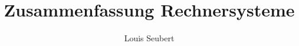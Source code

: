 \documentclass[a4paper,landscape]{article}
\title{Zusammenfassung Rechnersysteme}
\author{Louis Seubert}
\begin{document}
 \begin{multicols*}{3}
  
   
  
  
  
  
  
   
   
  
  
  
 \end{multicols*}
\end{document}
